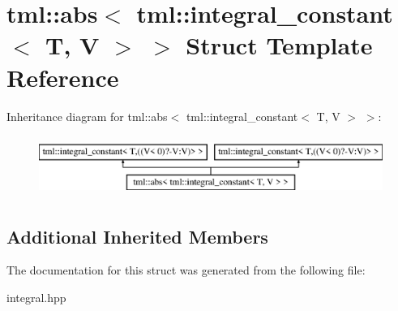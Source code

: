 \hypertarget{structtml_1_1abs_3_01tml_1_1integral__constant_3_01T_00_01V_01_4_01_4}{\section{tml\+:\+:abs$<$ tml\+:\+:integral\+\_\+constant$<$ T, V $>$ $>$ Struct Template Reference}
\label{structtml_1_1abs_3_01tml_1_1integral__constant_3_01T_00_01V_01_4_01_4}
}
Inheritance diagram for tml\+:\+:abs$<$ tml\+:\+:integral\+\_\+constant$<$ T, V $>$ $>$\+:\begin{figure}[H]
\begin{center}
\leavevmode
\includegraphics[height=2.000000cm]{structtml_1_1abs_3_01tml_1_1integral__constant_3_01T_00_01V_01_4_01_4}
\end{center}
\end{figure}
\subsection*{Additional Inherited Members}


The documentation for this struct was generated from the following file\+:\begin{DoxyCompactItemize}
\item 
integral.\+hpp\end{DoxyCompactItemize}
